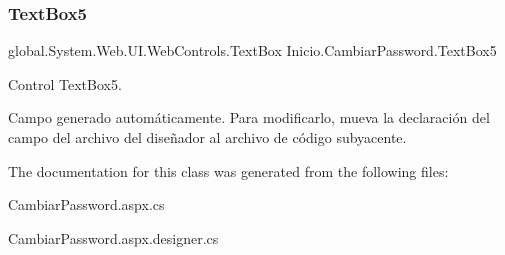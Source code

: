 \subsubsection{\texorpdfstring{TextBox5}{TextBox5}}
{\footnotesize\ttfamily global.\+System.\+Web.\+U\+I.\+Web\+Controls.\+Text\+Box Inicio.\+Cambiar\+Password.\+Text\+Box5\hspace{0.3cm}{\ttfamily [protected]}}



Control Text\+Box5. 

Campo generado automáticamente. Para modificarlo, mueva la declaración del campo del archivo del diseñador al archivo de código subyacente. 

The documentation for this class was generated from the following files\+:\begin{DoxyCompactItemize}
\item 
Cambiar\+Password.\+aspx.\+cs\item 
Cambiar\+Password.\+aspx.\+designer.\+cs\end{DoxyCompactItemize}
